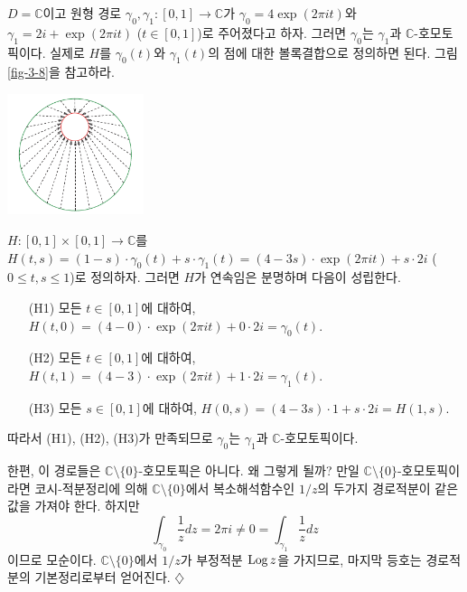 \begin{saltexample}[label=example-2-8]{}{}
$D=\mathbb C$이고 원형 경로 $\gamma_0, \gamma_1 : [0,1] \to \mathbb C$가
$\gamma_0 = 4\exp(2\pi it)$와 $\gamma_1 = 2i+\exp(2\pi it)$ ($t\in[0,1]$)로 주어졌다고 하자.
그러면 $\gamma_0$는 $\gamma_1$과 $\mathbb C$-호모토픽이다.
실제로  $H$를 $\gamma_0(t)$와 $\gamma_1(t)$의 점에 대한 볼록결합으로 정의하면 된다.
그림 \ref{fig-3-8}을 참고하라.

\begin{center}
\includegraphics[width=0.3\textwidth]{./SaltChapter/fig-3-0-3}
\end{center}

$H:[0,1]\times [0,1] \to \mathbb C$를 
$H(t,s) = (1-s)\cdot \gamma_0(t) + s\cdot \gamma_1(t)
= (4-3s)\cdot \exp(2\pi it) + s\cdot 2i$ ($0\le t,s\le 1$)로 정의하자.
그러면 $H$가 연속임은 분명하며 다음이 성립한다.
\begin{itemize}
\item[(H1)] 모든 $t\in [0,1]$에 대하여, $H(t,0)= (4-0)\cdot \exp(2\pi it) + 0\cdot 2i = \gamma_0(t)$.
\item[(H2)] 모든 $t\in [0,1]$에 대하여, $H(t,1)= (4-3)\cdot \exp(2\pi it) + 1\cdot 2i = \gamma_1(t)$.
\item[(H3)] 모든 $s\in [0,1]$에 대하여, $H(0,s)= (4-3s)\cdot 1 + s\cdot 2i = H(1,s)$.
\end{itemize}
따라서 (H1), (H2), (H3)가 만족되므로 
$\gamma_0$는 $\gamma_1$과 $\mathbb C$-호모토픽이다.

한편, 이 경로들은 $\mathbb C\setminus \{0\}$-호모토픽은 아니다.
왜 그렇게 될까? 만일 $\mathbb C\setminus \{0\}$-호모토픽이라면
코시-적분정리에 의해 $\mathbb C\setminus \{0\}$에서 복소해석함수인
$1/z$의 두가지 경로적분이 같은 값을 가져야 한다. 하지만
\[
\int_{\gamma_0} \dfrac 1z dz = 2\pi i \ne 0 = \int_{\gamma_1} \dfrac 1z dz
\]
이므로 모순이다. 
$\mathbb C\setminus \{0\}$에서 $1/z$가 부정적분 $\mathop{\mathrm{Log}} z$을 가지므로,
마지막 등호는 경로적분의 기본정리로부터 얻어진다.
\hfill $\diamondsuit$
\end{saltexample}

